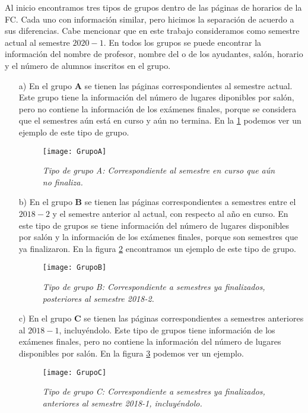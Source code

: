 Al inicio encontramos tres tipos de grupos dentro de las páginas de horarios de la FC. Cada uno con información similar, pero hicimos la separación de acuerdo a sus diferencias. Cabe mencionar que en este trabajo consideramos como semestre actual al semestre $2020-1$. En todos los grupos se puede encontrar la información del nombre de profesor, nombre del o de los ayudantes, salón, horario y el número de alumnos inscritos en el grupo.

\begin{enumerate}
\item[a)] En el grupo \textbf{A} se tienen las páginas correspondientes al semestre actual. Este grupo tiene la información del número de lugares diponibles por salón, pero no contiene la información de los exámenes finales, porque se considera que el semestres aún está en curso y aún no termina. En la \figurename{\ref{GpoA}} podemos ver un ejemplo de este tipo de grupo.

\begin{figure}[H]
\centering
\texttt{[image: GrupoA]} %
\caption[\textit{Tipo de grupo A}]{\textit{Tipo de grupo A: Correspondiente al semestre en curso que aún no finaliza.}}\label{GpoA}
\end{figure}


\item[b)] En el grupo \textbf{B} se tienen las páginas correspondientes a semestres entre el $2018-2$ y el semestre anterior al actual, con respecto al año en curso. En este tipo de grupos se tiene información del número de lugares disponibles por salón y la información de los exámenes finales, porque son semestres que ya finalizaron. En la figura \figurename{\ref{GpoB}} encontramos un ejemplo de este tipo de grupo.

\begin{figure}[H]
\centering
\texttt{[image: GrupoB]} %
\caption[\textit{Tipo de grupo B}]{\textit{Tipo de grupo B: Correspondiente a semestres ya finalizados, posteriores al semestre 2018-2.}}\label{GpoB}
\end{figure}

\item[c)] En el grupo \textbf{C} se tienen las páginas correspondientes a semestres anteriores al $2018-1$, incluyéndolo. Este tipo de grupos tiene información de los exámenes finales, pero no contiene la información del número de lugares disponibles por salón. En la figura \figurename{\ref{GpoC}} podemos ver un ejemplo.

\begin{figure}[H]
\centering
\texttt{[image: GrupoC]} %
\caption[\textit{Tipo de grupo C}]{\textit{Tipo de grupo C: Correspondiente a semestres ya finalizados, anteriores al semestre 2018-1, incluyéndolo.}}\label{GpoC}
\end{figure}
\end{enumerate}



